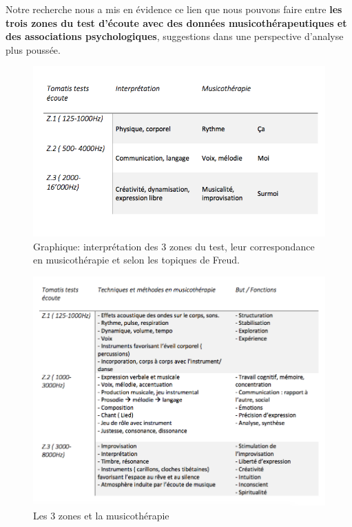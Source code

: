 Notre recherche nous a mis en évidence ce lien que nous pouvons faire entre 
\textbf{ les trois zones du
	test d'écoute avec des données musicothérapeutiques et des associations psychologiques},  
	suggestions dans une perspective d'analyse 
plus
poussée.
\begin{figure}
	\centering
	\includegraphics[width=1.0\linewidth]{images/testinterpmusico}
	\caption[ L'interprétation des 3 zones et leur correspondance
	en musicothérapie]{Graphique: interprétation des 3 zones du
		test, leur correspondance en musicothérapie et selon les
		topiques de Freud.}
	
	\label{graphiquecolonnetestmusico}
\end{figure}
 \clearpage
\begin{figure}[tbh]
	\centering
	\includegraphics[width=1.0\linewidth]{images/testtechnmethbut}
	\caption[Zones du test avec la musicothérapie]{Les 3
		zones et la musicothérapie}
	
	\label{testbutetfonction}
\end{figure}

